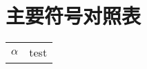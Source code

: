 
\chapter{主要符号对照表}
\label{chap:symb}


\begin{center}
	

\vspace{1cm}
\begin{tabular}{ll}
	$\alpha$ \qquad & \hspace{5em}test \\

\end{tabular}


\end{center}
